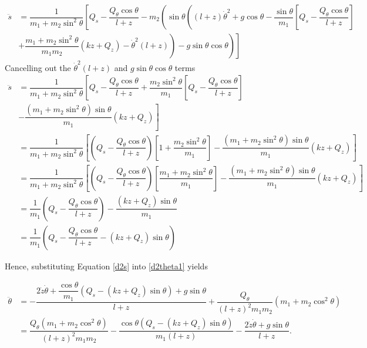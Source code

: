 \documentclass[12pt,a4paper,portrait]{article}
\begin{document}
\begin{align*}
	\ddot{s} &= \dfrac{1}{m_1+m_2\sin^2{\theta}}\left[Q_s - \dfrac{Q_{\theta}\cos{\theta}}{l+z} - m_2\left(\sin{\theta}\left((l+z)\dot{\theta}^2+g\cos{\theta} - \dfrac{\sin{\theta}}{m_1}\left[Q_s - \dfrac{Q_{\theta}\cos{\theta}}{l+z} \right]\right.\right.\right.\\
	&\left.\left.\left.+\dfrac{m_1+m_2\sin^2{\theta}}{m_1m_2}\left(kz + Q_z\right)-\dot{\theta}^2(l+z)\right) - g\sin{\theta}\cos{\theta}\right)\right]
\end{align*}
Cancelling out the $\dot{\theta}^2(l+z)$ and $g\sin{\theta}\cos{\theta}$ terms
\begin{align}
	\ddot{s} &= \dfrac{1}{m_1+m_2\sin^2{\theta}}\left[Q_s - \dfrac{Q_{\theta}\cos{\theta}}{l+z} +  \dfrac{m_2\sin^2{\theta}}{m_1}\left[Q_s - \dfrac{Q_{\theta}\cos{\theta}}{l+z} \right]\right.\nonumber\\
	&\left.-\dfrac{(m_1+m_2\sin^2{\theta})\sin{\theta}}{m_1}\left(kz + Q_z\right)\right]\nonumber\\
	&= \dfrac{1}{m_1+m_2\sin^2{\theta}}\left[\left(Q_s - \dfrac{Q_{\theta}\cos{\theta}}{l+z}\right)\left[1+\dfrac{m_2\sin^2{\theta}}{m_1}\right]-\dfrac{(m_1+m_2\sin^2{\theta})\sin{\theta}}{m_1}\left(kz + Q_z\right)\right]\nonumber\\
	&=  \dfrac{1}{m_1+m_2\sin^2{\theta}}\left[\left(Q_s - \dfrac{Q_{\theta}\cos{\theta}}{l+z}\right)\left[\dfrac{m_1+m_2\sin^2{\theta}}{m_1}\right]-\dfrac{(m_1+m_2\sin^2{\theta})\sin{\theta}}{m_1}\left(kz + Q_z\right)\right] \nonumber\\
	&= \dfrac{1}{m_1}\left(Q_s - \dfrac{Q_{\theta}\cos{\theta}}{l+z}\right) -\dfrac{(kz+Q_z)\sin{\theta}}{m_1} \nonumber\\
	&= \dfrac{1}{m_1}\left(Q_s - \dfrac{Q_{\theta}\cos{\theta}}{l+z}-(kz+Q_z)\sin{\theta}\right) \label{d2s}
\end{align}

Hence, substituting Equation \eqref{d2s} into \eqref{d2theta1} yields

\begin{align*}
	\ddot{\theta} &= -\dfrac{2\dot{z}\dot{\theta}+\dfrac{\cos{\theta}}{m_1}\left(Q_s -(kz+Q_z)\sin{\theta}\right) + g\sin{\theta}}{l+z} + \dfrac{Q_{\theta}}{(l+z)^2m_1m_2}(m_1+m_2\cos^2{\theta})\\
	&= \dfrac{Q_{\theta}(m_1+m_2\cos^2{\theta})}{(l+z)^2m_1m_2} - \dfrac{\cos{\theta}(Q_s - (kz+Q_z)\sin{\theta})}{m_1(l+z)} - \dfrac{2\dot{z}\dot{\theta} + g\sin{\theta}}{l+z}.
\end{align*}
\end{document}
